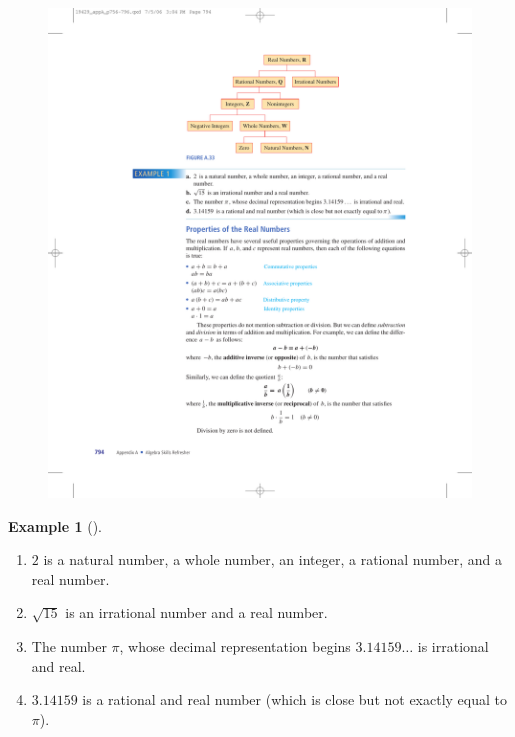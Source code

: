 \documentclass[10pt,]{book}
\theoremstyle{plain}
\theoremstyle{definition}
\theoremstyle{definition}
\newtheorem{example}[theorem]{Example}
\theoremstyle{definition}
\numberwithin{equation}{part}
\begin{document}
\begin{figure}
\centering
\includegraphics[width=0.8\linewidth]{images/fig-real-numbers}
\caption{\label{fig-real-numbers}}
\end{figure}
%
\begin{example}[]\label{example-90}
\leavevmode%
\begin{enumerate}[label=*\alph**]
\item\hypertarget{li-385}{}\(2\) is a natural number, a whole number, an integer, a rational number, and a real number.%
\item\hypertarget{li-386}{}\(\sqrt{15}\) is an irrational number and a real number.%
\item\hypertarget{li-387}{}The number \(\pi\), whose decimal representation begins \(3.14159\ldots\) is irrational and real.%
\item\hypertarget{li-388}{}\(3.14159\) is a rational and real number (which is close but not exactly equal to \(\pi\)).%
\end{enumerate}
%
\end{example}
\typeout{************************************************}
\typeout{************************************************}
\end{document}
